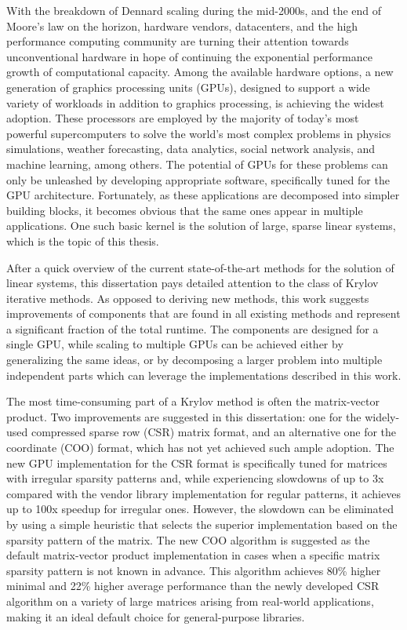 With the breakdown of Dennard scaling during the mid-2000s, and the end of
Moore's law on the horizon, hardware vendors, datacenters, and the high
performance computing community are turning their attention towards
unconventional hardware in hope of continuing the exponential performance growth
of computational capacity. Among the available hardware options, a new
generation of graphics processing units (GPUs), designed to support a wide
variety of workloads in addition to graphics processing, is achieving the widest
adoption.  These processors are employed by the majority of today's most
powerful supercomputers to solve the world's most complex problems in physics
simulations, weather forecasting, data analytics, social network analysis, and
machine learning, among others. The potential of GPUs for these problems can
only be unleashed by developing appropriate software, specifically tuned for the
GPU architecture.  Fortunately, as these applications are decomposed into
simpler building blocks, it becomes obvious that the same ones appear in
multiple applications. One such basic kernel is the solution of large, sparse
linear systems, which is the topic of this thesis.

After a quick overview of the current state-of-the-art methods for the solution
of linear systems, this dissertation pays detailed attention to the class of
Krylov iterative methods. As opposed to deriving new methods, this work suggests
improvements of components that are found in all existing methods and represent
a significant fraction of the total runtime. The components are designed for a
single GPU, while scaling to multiple GPUs can be achieved either by
generalizing the same ideas, or by decomposing a larger problem into multiple
independent parts which can leverage the implementations described in this work.

The most time-consuming part of a Krylov method is often the matrix-vector
product. Two improvements are suggested in this dissertation: one for the
widely-used compressed sparse row (CSR) matrix format, and an alternative one
for the coordinate (COO) format, which has not yet achieved such ample adoption.
The new GPU implementation for the CSR format is specifically tuned for matrices
with irregular sparsity patterns and, while experiencing slowdowns of up to 3x
compared with the vendor library implementation for regular patterns, it
achieves up to 100x speedup for irregular ones.  However, the slowdown can be
eliminated by using a simple heuristic that selects the superior implementation
based on the sparsity pattern of the matrix.  The new COO algorithm is suggested
as the default matrix-vector product implementation in cases when a specific
matrix sparsity pattern is not known in advance. This algorithm achieves
80\% higher minimal and 22\% higher average performance than the newly developed
CSR algorithm on a variety of large matrices arising from real-world
applications, making it an ideal default choice for general-purpose libraries.

